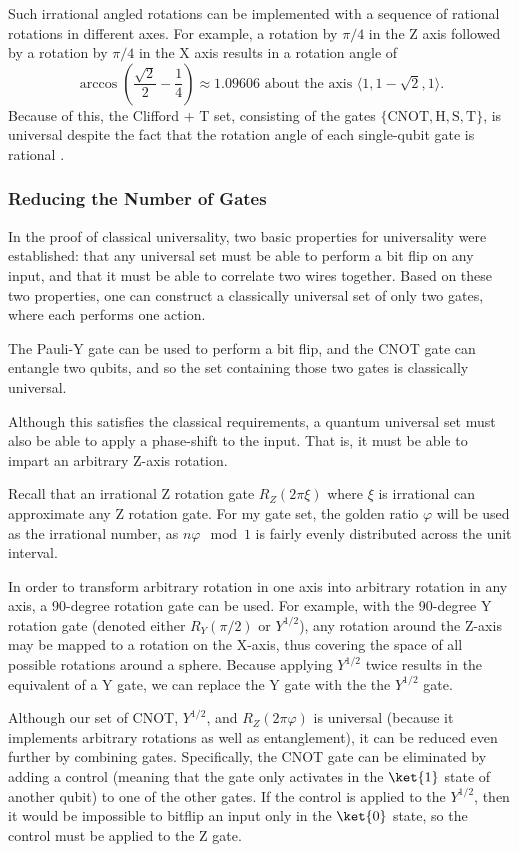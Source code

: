 \documentclass[12pt]{article}
\begin{document}
Such irrational angled rotations can be implemented with a sequence of rational rotations in different axes. For example, a rotation by $\pi/4$ in the Z axis followed by a rotation by $\pi / 4$ in the X axis results in a rotation angle of
$$\arccos\left(\frac{\sqrt{2}}{2} - \frac{1}{4}\right) \approx 1.09606 \text{ about the axis } \langle 1, 1 - \sqrt{2}, 1 \rangle \text{.}$$
Because of this, the Clifford + T set, consisting of the gates $\{\text{CNOT}, \text{H}, \text{S}, \text{T}\}$, is universal despite the fact that the rotation angle of each single-qubit gate is rational \cite{Boykin2000}.


\subsubsection{Reducing the Number of Gates}
In the proof of classical universality, two basic properties for universality were established: that any universal set must be able to perform a bit flip on any input, and that it must be able to correlate two wires together. Based on these two properties, one can construct a classically universal set of only two gates, where each performs one action.

The Pauli-Y gate can be used to perform a bit flip, and the CNOT gate can entangle two qubits, and so the set containing those two gates is classically universal.

Although this satisfies the classical requirements, a quantum universal set must also be able to apply a phase-shift to the input. That is, it must be able to impart an arbitrary Z-axis rotation.

Recall that an irrational Z rotation gate $R_Z(2\pi\xi)$ where $\xi$ is irrational can approximate any Z rotation gate. For my gate set, the golden ratio $\varphi$ will be used as the irrational number, as $n \varphi \mod 1$ is fairly evenly distributed across the unit interval.

In order to transform arbitrary rotation in one axis into arbitrary rotation in any axis, a 90-degree rotation gate can be used. For example, with the 90-degree Y rotation gate (denoted either $R_Y(\pi/2)$ or $Y^{1/2}$), any rotation around the Z-axis may be mapped to a rotation on the X-axis, thus covering the space of all possible rotations around a sphere. Because applying $Y^{1/2}$ twice results in the equivalent of a Y gate, we can replace the Y gate with the the $Y^{1/2}$ gate.

Although our set of CNOT, $Y^{1/2}$, and $R_Z(2\pi\varphi)$ is universal (because it implements arbitrary rotations as well as entanglement), it can be reduced even further by combining gates. Specifically, the CNOT gate can be eliminated by adding a control (meaning that the gate only activates in the $\ket{1}$ state of another qubit) to one of the other gates. If the control is applied to the $Y^{1/2}$, then it would be impossible to bitflip an input only in the $\ket{0}$ state, so the control must be applied to the Z gate.
\end{document}
